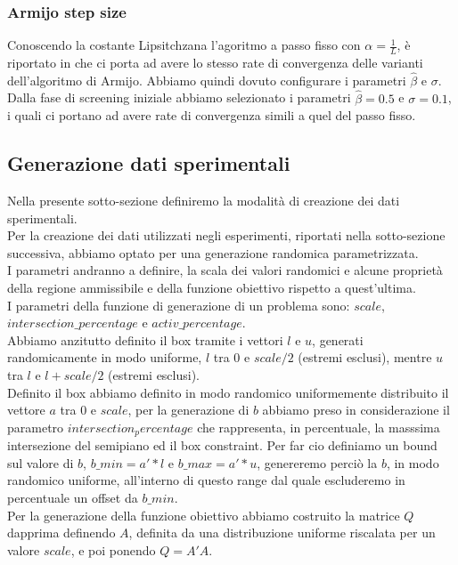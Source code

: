 \documentclass{article}
\begin{document}
\subsubsection{Armijo step size}
Conoscendo la costante  Lipsitchzana l'agoritmo a passo fisso con $\alpha = \frac{1}{L}$, è riportato in \cite{gafni1982convergence} che  ci porta ad avere lo stesso rate di convergenza delle varianti dell'algoritmo di Armijo. Abbiamo quindi dovuto configurare i parametri $\hat{\beta}$ e $\sigma$. Dalla fase di screening iniziale abbiamo selezionato i parametri $\hat{\beta}= 0.5$ e $\sigma = 0.1$, i quali ci portano ad avere rate di convergenza simili a quel del passo fisso.
\subsection{Generazione dati sperimentali}
Nella presente sotto-sezione definiremo la modalità di creazione dei dati sperimentali.\\
Per la creazione dei dati utilizzati negli esperimenti, riportati nella sotto-sezione successiva, abbiamo optato per una generazione randomica parametrizzata.\\
I parametri andranno a definire, la scala dei valori randomici e alcune proprietà della regione ammissibile e della funzione obiettivo rispetto a quest'ultima.\\
I parametri della funzione di generazione di un problema sono: $scale$, $intersection\_percentage$ e $activ\_percentage$.\\
Abbiamo anzitutto definito il box tramite i vettori $l$ e $u$, generati randomicamente in modo uniforme, $l$ tra 0 e $scale/2$ (estremi esclusi), mentre $u$ tra $l$ e $l + scale/2$ (estremi esclusi).\\
Definito il box abbiamo definito in modo randomico uniformemente distribuito il vettore $a$ tra 0 e $scale$, per la generazione di $b$ abbiamo preso in considerazione il parametro $intersection_percentage$ che rappresenta, in percentuale, la masssima intersezione del semipiano ed il box constraint. Per far cio definiamo un bound sul valore di $b$, $b\_min = a'*l$ e $b\_max = a'*u$, genereremo perciò la $b$, in modo randomico uniforme, all'interno di questo range dal quale escluderemo in percentuale un offset da $b\_min$.\\
Per la generazione della funzione obiettivo abbiamo costruito la matrice $Q$ dapprima definendo $A$, definita da una distribuzione uniforme riscalata per un valore $scale$, e poi ponendo $Q = A'A$.\\
\end{document}
